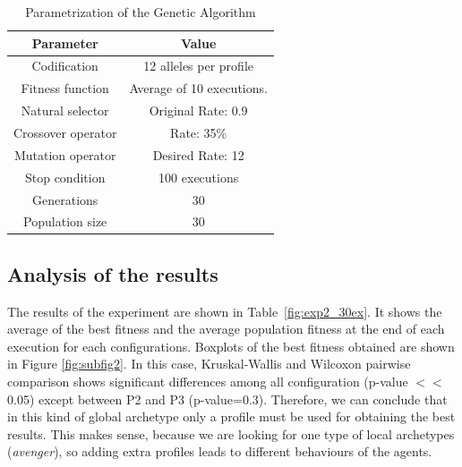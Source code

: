 \documentclass{sig-alternate}
\begin{document}
\begin{table}
\begin{center}
\caption{Parametrization of the Genetic Algorithm}
\label{fig:ga_parameters}
\begin{tabular}{cc}%
\hline\noalign{\smallskip}
\noalign{\smallskip}
Parameter & Value \\
\hline
\noalign{\smallskip}
Codification & 12 alleles per profile\\
Fitness function & Average of 10 executions.\\
Natural selector & Original Rate: 0.9 \\
Crossover operator & Rate: 35\% \\
Mutation operator & Desired Rate: 12 \\
Stop condition & 100 executions\\
Generations & 30\\
Population size & 30 \\
\hline
\end{tabular}


\end{center}
\end{table}

\subsection{Analysis of the results}

The results of the experiment are shown in
Table~\ref{fig:exp2_30ex}. It shows the average of the best fitness
and the average population fitness at the end of each execution for
each configurations. Boxplots of the best fitness obtained are shown
in Figure \ref{fig:subfig2}. In this case, Kruskal-Wallis and Wilcoxon
pairwise comparison shows significant differences among all
configuration (p-value $<<$ 0.05) except between P2 and P3
(p-value=0.3). Therefore, we can conclude that in this kind of global
archetype only a profile must be used for obtaining the best
results. This makes sense, because we are looking for one type of
local archetypes ({\em avenger}), so adding extra profiles leads to
different behaviours of the agents. 
\end{document}
